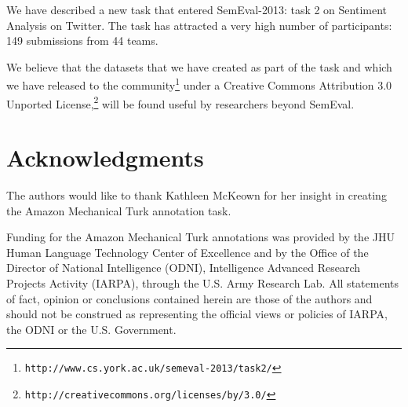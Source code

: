 We have described a new task that entered SemEval-2013: task 2 on Sentiment Analysis on Twitter.
The task has attracted a very high number of participants: 149 submissions from 44 teams.

We believe that the datasets that we have created as part of the task and which we have
released to the community\footnote{\texttt{http://www.cs.york.ac.uk/semeval-2013/task2/}} under a
Creative Commons Attribution 3.0 Unported License,\footnote{\texttt{http://creativecommons.org/licenses/by/3.0/}}
will be found useful by researchers beyond SemEval.

\section*{Acknowledgments}

The authors would like to thank Kathleen McKeown for her insight in creating the Amazon Mechanical Turk annotation task.


Funding for the Amazon Mechanical Turk annotations was provided by the JHU Human Language Technology Center of Excellence and by
 the Office of the Director of National Intelligence (ODNI), Intelligence Advanced Research Projects Activity (IARPA), through the U.S. Army Research Lab. All statements of fact, opinion or conclusions contained herein are those of the authors and should not be construed as representing the official views or policies of IARPA, the ODNI or the U.S. Government.

